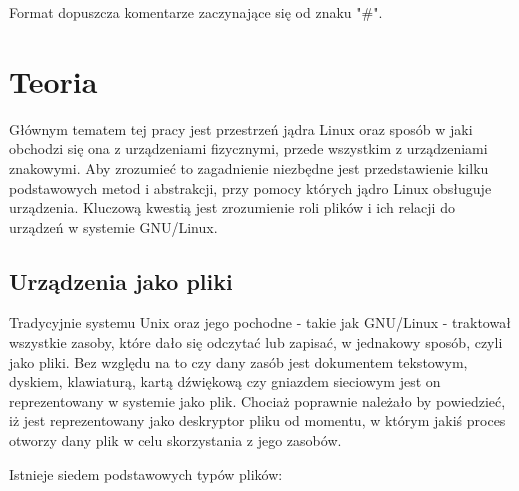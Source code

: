 \documentclass[10pt]{scrartcl}
\begin{document}
Format dopuszcza komentarze zaczynające się od znaku "\#".

\section{Teoria}
\label{theory}

Głównym tematem tej pracy jest przestrzeń jądra Linux oraz sposób w jaki obchodzi się ona z urządzeniami fizycznymi, przede wszystkim z urządzeniami znakowymi. Aby zrozumieć to zagadnienie niezbędne jest przedstawienie kilku podstawowych metod i abstrakcji, przy pomocy których jądro Linux obsługuje urządzenia. Kluczową kwestią jest zrozumienie roli plików i ich relacji do urządzeń w systemie GNU/Linux.

\subsection{Urządzenia jako pliki}
\label{devasfiles}

Tradycyjnie systemu Unix oraz jego pochodne - takie jak GNU/Linux - traktował wszystkie zasoby, które dało się odczytać lub zapisać, w jednakowy sposób, czyli jako pliki. Bez względu na to czy dany zasób jest dokumentem tekstowym, dyskiem, klawiaturą, kartą dźwiękową czy gniazdem sieciowym jest on reprezentowany w systemie jako plik. Chociaż poprawnie należało by powiedzieć, iż jest reprezentowany jako deskryptor pliku od momentu, w którym jakiś proces otworzy dany plik w celu skorzystania z jego zasobów.

Istnieje siedem podstawowych typów plików:
\end{document}
